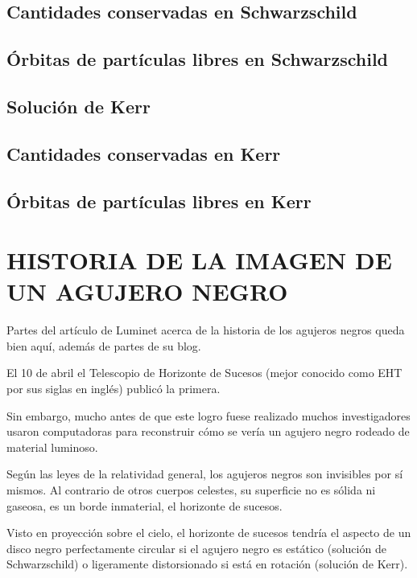 \documentclass[10pt]{article}
\begin{document}
\subsection{Cantidades conservadas en Schwarzschild}

\subsection{Órbitas de partículas libres en Schwarzschild}

\subsection{Solución de Kerr}

\subsection{Cantidades conservadas en Kerr}

\subsection{Órbitas de partículas libres en Kerr}

\section{HISTORIA DE LA IMAGEN DE UN AGUJERO NEGRO}

Partes del artículo de Luminet acerca de la historia de los agujeros negros queda bien aquí, además de partes de su blog. 

El 10 de abril el Telescopio de Horizonte de Sucesos (mejor conocido como EHT por sus siglas en inglés) publicó la primera. \bigskip

Sin embargo, mucho antes de que este logro fuese realizado muchos investigadores usaron computadoras para reconstruir cómo se vería un agujero negro rodeado de material luminoso. \bigskip

Según las leyes de la relatividad general, los agujeros negros son invisibles por sí mismos. Al contrario de otros cuerpos celestes, su superficie no es sólida ni gaseosa, es un borde inmaterial, el horizonte de sucesos.

Visto en proyección sobre el cielo, el horizonte de sucesos tendría el aspecto de un disco negro perfectamente circular si el agujero negro es estático (solución de Schwarzschild) o ligeramente distorsionado si está en rotación (solución de Kerr).
\end{document}
